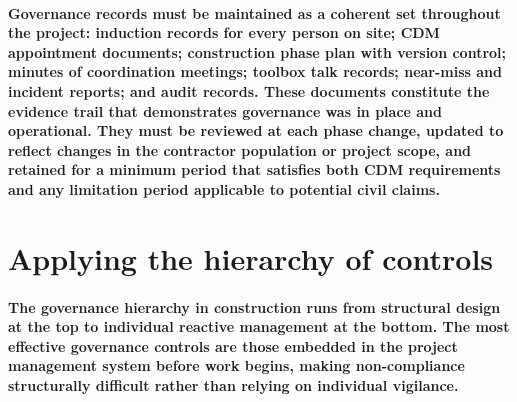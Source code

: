 \paragraph{Governance records must be maintained as a coherent set throughout the project: induction records for every person on site; CDM appointment documents; construction phase plan with version control; minutes of coordination meetings; toolbox talk records; near-miss and incident reports; and audit records. These documents constitute the evidence trail that demonstrates governance was in place and operational. They must be reviewed at each phase change, updated to reflect changes in the contractor population or project scope, and retained for a minimum period that satisfies both CDM requirements and any limitation period applicable to potential civil claims.}


\section{Applying the hierarchy of controls}

\paragraph{The governance hierarchy in construction runs from structural design at the top to individual reactive management at the bottom. The most effective governance controls are those embedded in the project management system before work begins, making non-compliance structurally difficult rather than relying on individual vigilance.}

